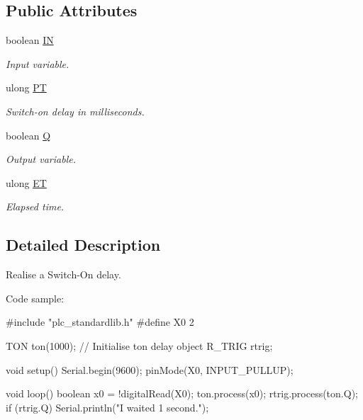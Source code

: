 \subsection*{Public Attributes}
\begin{DoxyCompactItemize}
\item 
\hypertarget{class_t_o_n_a094db3c6705233bbc0e7c510282d3351}{boolean \hyperlink{class_t_o_n_a094db3c6705233bbc0e7c510282d3351}{I\+N}}\label{class_t_o_n_a094db3c6705233bbc0e7c510282d3351}

\begin{DoxyCompactList}\small\item\em Input variable. \end{DoxyCompactList}\item 
\hypertarget{class_t_o_n_a7fa59ffa01c081cc6c1f6f0379d616d0}{ulong \hyperlink{class_t_o_n_a7fa59ffa01c081cc6c1f6f0379d616d0}{P\+T}}\label{class_t_o_n_a7fa59ffa01c081cc6c1f6f0379d616d0}

\begin{DoxyCompactList}\small\item\em Switch-\/on delay in milliseconds. \end{DoxyCompactList}\item 
\hypertarget{class_t_o_n_ae3f41411363357b969628e2cc23d7036}{boolean \hyperlink{class_t_o_n_ae3f41411363357b969628e2cc23d7036}{Q}}\label{class_t_o_n_ae3f41411363357b969628e2cc23d7036}

\begin{DoxyCompactList}\small\item\em Output variable. \end{DoxyCompactList}\item 
\hypertarget{class_t_o_n_adf64c0fcf5018f4c20e49966003185ba}{ulong \hyperlink{class_t_o_n_adf64c0fcf5018f4c20e49966003185ba}{E\+T}}\label{class_t_o_n_adf64c0fcf5018f4c20e49966003185ba}

\begin{DoxyCompactList}\small\item\em Elapsed time. \end{DoxyCompactList}\end{DoxyCompactItemize}


\subsection{Detailed Description}
Realise a Switch-\/\+On delay. 

Code sample\+: \begin{DoxyVerb}#include "plc_standardlib.h"
#define X0 2

TON ton(1000);  // Initialise ton delay object
R_TRIG rtrig;

void setup() {
    Serial.begin(9600);
    pinMode(X0, INPUT_PULLUP);
}

void loop() {
    boolean x0 = !digitalRead(X0);
    ton.process(x0);
    rtrig.process(ton.Q);
    if (rtrig.Q) {
        Serial.println("I waited 1 second.");
    }
}\end{DoxyVerb}
 

